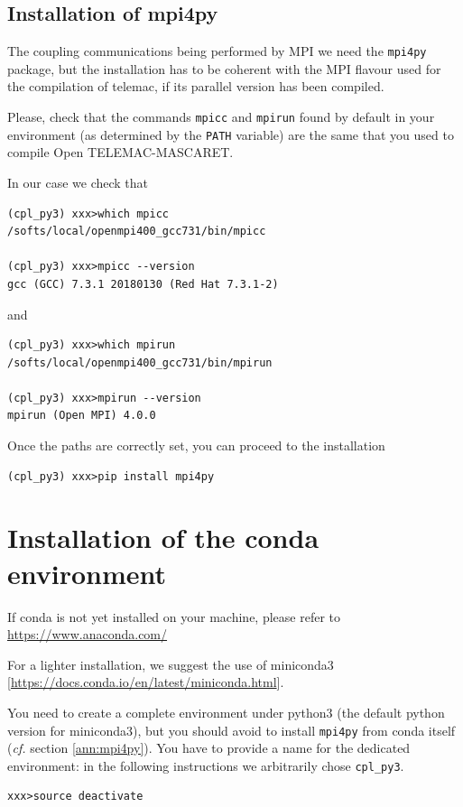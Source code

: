 \documentclass[Coupling]{../../data/TelemacDoc} %
\begin{document}
\begin{appendices}
\section{Installation of mpi4py}\label{ann:venv_mpi4py}
The coupling communications being performed by MPI we need the
\texttt{mpi4py} package, but the installation has to be coherent with
the MPI flavour used for the compilation of telemac, if its parallel
version has been compiled.

Please, check that the commands \texttt{mpicc} and \texttt{mpirun}
found by default in your environment (as determined by the
\texttt{PATH} variable) are the same that you used to compile Open
TELEMAC-MASCARET.

In our case we check that
\begin{verbatim}
(cpl_py3) xxx>which mpicc
/softs/local/openmpi400_gcc731/bin/mpicc

(cpl_py3) xxx>mpicc --version
gcc (GCC) 7.3.1 20180130 (Red Hat 7.3.1-2)
\end{verbatim}
and
\begin{verbatim}
(cpl_py3) xxx>which mpirun
/softs/local/openmpi400_gcc731/bin/mpirun

(cpl_py3) xxx>mpirun --version
mpirun (Open MPI) 4.0.0
\end{verbatim}

Once the paths are correctly set, you can proceed to the installation
\begin{verbatim}
(cpl_py3) xxx>pip install mpi4py
\end{verbatim}


\chapter{Installation of the conda
  environment}\label{ann:conda_install}

If conda is not yet installed on your machine, please refer to
\url{https://www.anaconda.com/}

For a lighter installation, we suggest the use of miniconda3
[\url{https://docs.conda.io/en/latest/miniconda.html}].
\newline

You need to create a complete environment under python3 (the default
python version for miniconda3), but you should avoid to install
\texttt{mpi4py} from conda itself ({\em cf.} section
\ref{ann:mpi4py}). You have to provide a name for the dedicated
environment: in the following instructions we arbitrarily chose \texttt{cpl\_py3}.
\begin{verbatim}
xxx>source deactivate


\end{verbatim}
\end{appendices}
\end{document}
